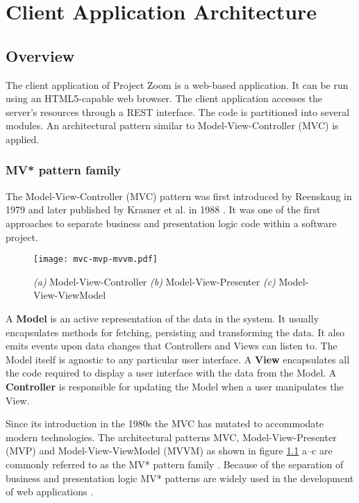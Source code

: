 \chapter{Client Application Architecture}

\section{Overview}
The client application of Project Zoom is a web-based application. It can be run using an HTML5-capable web browser. The client application accesses the server's resources through a REST interface. The code is partitioned into several modules. An architectural pattern similar to Model-View-Controller (MVC) is applied.

\subsection{MV* pattern family}
The Model-View-Controller (MVC) pattern was first introduced by Reenskaug in 1979 \cite{Reenskaug_1979} and later published by Krasner et al. in 1988 \cite{Krasner_1988}. It was one of the first approaches to separate business and presentation logic code within a software project.

\begin{figure}
\texttt{[image: mvc-mvp-mvvm.pdf]}
\caption[Diagrams of Model-View-Controller, Model-View-Presenter and Model-View-ViewModel]{\textit{(a)} Model-View-Controller \textit{(b)} Model-View-Presenter \textit{(c)} Model-View-ViewModel}
\label{fig:MV}
\end{figure}

A \textbf{Model} is an active representation of the data in the system. It usually encapsulates methods for fetching, persisting and transforming the data. It also emits events upon data changes that Controllers and Views can listen to. The Model itself is agnostic to any particular user interface. A \textbf{View} encapsulates all the code required to display a user interface with the data from the Model. A \textbf{Controller} is responsible for updating the Model when a user manipulates the View. \cite{Krasner_1988} \cite{Gamma_1994}

Since its introduction in the 1980s the MVC has mutated to accommodate modern technologies. The architectural patterns MVC, Model-View-Presenter (MVP) and Model-View-ViewModel (MVVM) as shown in figure \ref{fig:MV} a–c are commonly referred to as the MV* pattern family \cite{Osmani_2012}. Because of the separation of business and presentation logic MV* patterns are widely used in the development of web applications \cite{Takada_2012}.

